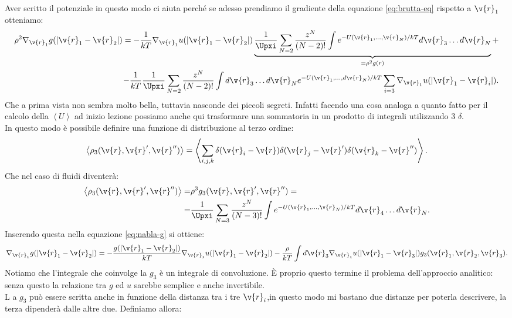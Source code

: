Aver scritto il potenziale in questo modo ci aiuta perché se adesso prendiamo il gradiente della equazione \ref{eq:brutta-eq} rispetto a $\v{r}_1$ otteniamo:
\[\begin{aligned}
	\rho ^2\nabla_{\v{r}_1}g(\left| \v{r}_1-\v{r}_2 \right| ) =
	- \frac{1}{kT} \nabla_{\v{r}_1}u(\left| \v{r}_1-\v{r}_2 \right|)
	\underbrace{
	\frac{1}{\Upxi}\sum_{N=2}^{} \frac{z^N}{(N-2)!}
	\int e^{- U(\v{r}_1,\ldots,\v{r}_N)/kT}d \v{r}_3\ldots d \v{r}_N 
	}_{=\rho ^2 g(r)}
	+ \\
	- \frac{1}{kT} \frac{1}{\Upxi} \sum_{N=2}^{} \frac{z^N}{(N-2)!}
	\int d\v{r}_3 \ldots d \v{r}_N e^{-U(\v{r}_1,\ldots,d \v{r}_N)/kT}
	\sum_{i=3}^{} \nabla_{\v{r}_1}u(\left| \v{r}_1 - \v{r}_i \right| )
	\label{eq:nabla-g}
.\end{aligned}\]
Che a prima vista non sembra molto bella, tuttavia nasconde dei piccoli segreti. Infatti facendo una cosa analoga a quanto fatto per il calcolo della $\left<U \right>$ ad inizio lezione possiamo anche qui trasformare una sommatoria in un prodotto di integrali utilizzando 3 $\delta$. \\
In questo modo è possibile definire una funzione di distribuzione al terzo ordine:
\[
	\left<\rho _3(\v{r},\v{r}',\v{r}'') \right> 
	=
	\left< 
	\sum_{i,j,k}^{} 
	\delta(\v{r}_i-\v{r})\delta(\v{r}_j-\v{r}')\delta(\v{r}_k-\v{r}'')
	\right>
.\] 
Che nel caso di fluidi diventerà:
\[\begin{aligned}
	\left<\rho _3(\v{r},\v{r}',\v{r}'') \right> 
	=&
	\rho ^3 g_3(\v{r},\v{r}',\v{r}'') =\\
	=&
	\frac{1}{\Upxi}\sum_{N=3}^{} 
	\frac{z^N}{(N-3)!}\int e^{-U(\v{r}_1,\ldots,\v{r}_N)/kT} d \v{r}_4\ldots d \v{r}_N
.\end{aligned}\]
Inserendo questa nella equazione \ref{eq:nabla-g} si ottiene:
\[
	\nabla_{\v{r}_1} g(\left| \v{r}_1-\v{r}_2 \right| ) 
	=
	- \frac{g(\left| \v{r}_1 -\v{r}_2\right| )}{kT}  
	\nabla_{\v{r}_1}u(\left| \v{r}_1-\v{r}_2 \right|) 
	-
	\frac{\rho }{kT} \int d \v{r}_3\nabla_{\v{r}_1}u(\left| \v{r}_1-\v{r}_3 \right|)
	g_3(\v{r}_1,\v{r}_2,\v{r}_3)
	\label{eq:non-approx-g}
.\] 
Notiamo che l'integrale che coinvolge la $g_3$ è un integrale di convoluzione. È proprio questo termine il problema dell'approccio analitico: senza questo la relazione tra $g$ ed $u$ sarebbe semplice e anche invertibile.\\
L a $g_3$ può essere scritta anche in funzione della distanza tra i tre  $\v{r}_i$,in questo modo mi bastano due distanze per poterla descrivere, la terza dipenderà dalle altre due. Definiamo allora:

